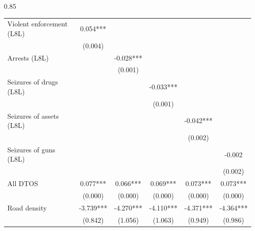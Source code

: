 \documentclass[12pt,letterpaper]{article}
\begin{document}
\begin{landscape}
\begin{center}
\begin{spacing}{0.85}
\begin{longtable}{lccccc}
Violent enforcement (L8L)  & 0.054*** &   &   &   &   \\
 & (0.004)  &   &   &   &   \\
Arrests (L8L)  &   & -0.028*** &   &   &   \\
 &   & (0.001)  &   &   &   \\
Seizures of drugs (L8L)  &   &   & -0.033*** &   &   \\
 &   &   & (0.001)  &   &   \\
Seizures of assets (L8L) &   &   &   & -0.042*** &   \\
 &   &   &   & (0.002)  &   \\
Seizures of guns (L8L)  &   &   &   &   & -0.002  \\
 &   &   &   &   & (0.002)  \\
                
All DTOS & 0.077*** & 0.066*** & 0.069*** & 0.073*** & 0.073*** \\
 & (0.000)  & (0.000)  & (0.000)  & (0.000)  & (0.000)  \\
               
Road density & -3.739*** & -4.270*** & -4.110*** & -4.371*** & -4.364*** \\
 & (0.842)  & (1.056)  & (1.063)  & (0.949)  & (0.986)  \\


\end{longtable}
\end{spacing}
\end{center}
\end{landscape}
\end{document}
